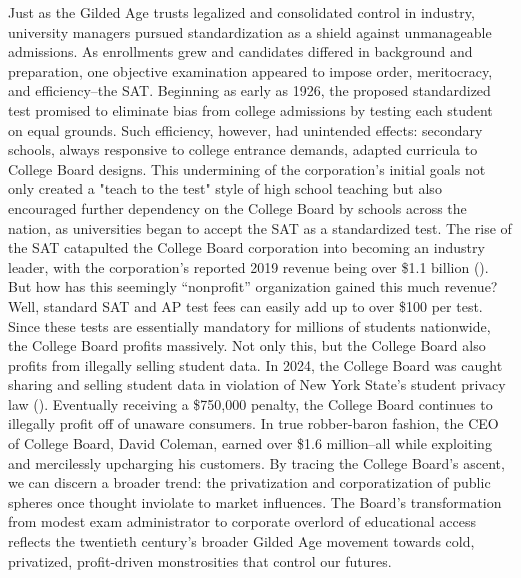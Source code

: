 \documentclass[12pt, a4paper, twoside]{article}
\begin{document}
Just as the Gilded Age trusts legalized and consolidated control in industry, university managers pursued standardization as a shield against unmanageable admissions. As enrollments grew and candidates differed in background and preparation, one objective examination appeared to impose order, meritocracy, and efficiency–the SAT. Beginning as early as 1926, the proposed standardized test promised to eliminate bias from college admissions by testing each student on equal grounds. Such efficiency, however, had unintended effects: secondary schools, always responsive to college entrance demands, adapted curricula to College Board designs. This undermining of the corporation's initial goals not only created a "teach to the test" style of high school teaching but also encouraged further dependency on the College Board by schools across the nation, as universities began to accept the SAT as a standardized test. The rise of the SAT catapulted the College Board corporation into becoming an industry leader, with the corporation’s reported 2019 revenue being over \$1.1 billion (\cite{totalregistration}). But how has this seemingly “nonprofit” organization gained this much revenue? Well, standard SAT and AP test fees can easily add up to over \$100 per test. Since these tests are essentially mandatory for millions of students nationwide, the College Board profits massively. Not only this, but the College Board also profits from illegally selling student data. In 2024, the College Board was caught sharing and selling student data in violation of New York State’s student privacy law (\cite{desantis2024}). Eventually receiving a \$750,000 penalty, the College Board continues to illegally profit off of unaware consumers. In true robber-baron fashion, the CEO of College Board, David Coleman, earned over \$1.6 million–all while exploiting and mercilessly upcharging his customers. By tracing the College Board's ascent, we can discern a broader trend: the privatization and corporatization of public spheres once thought inviolate to market influences. The Board's transformation from modest exam administrator to corporate overlord of educational access reflects the twentieth century's broader Gilded Age movement towards cold, privatized, profit-driven monstrosities that control our futures.
\end{document}
